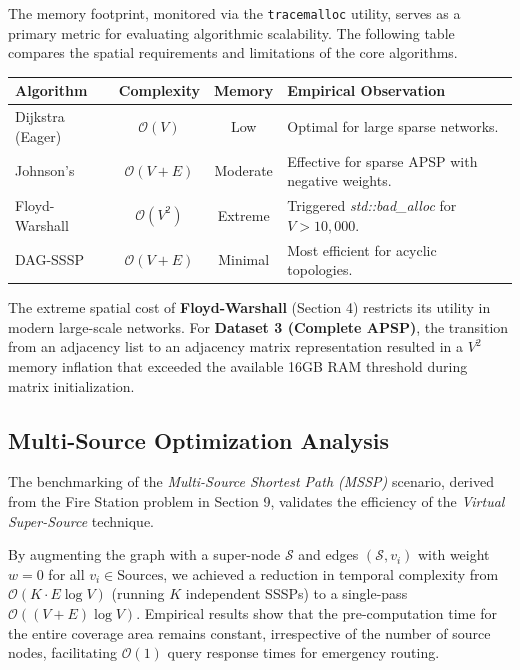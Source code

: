 The memory footprint, monitored via the \texttt{tracemalloc} utility, serves as a primary metric for evaluating algorithmic scalability. The following table compares the spatial requirements and limitations of the core algorithms.

\begin{center}
\small
\begin{tabular}{|p{3cm}|c|c|p{4.5cm}|}
\hline
\textbf{Algorithm} & \textbf{Complexity} & \textbf{Memory} & \textbf{Empirical Observation} \\ \hline
Dijkstra (Eager) & $\mathcal{O}(V)$ & Low & Optimal for large sparse networks. \\ \hline
Johnson's & $\mathcal{O}(V + E)$ & Moderate & Effective for sparse APSP with negative weights. \\ \hline
Floyd-Warshall & $\mathcal{O}(V^2)$ & Extreme & Triggered \textit{std::bad\_alloc} for $V > 10,000$. \\ \hline
DAG-SSSP & $\mathcal{O}(V + E)$ & Minimal & Most efficient for acyclic topologies. \\ \hline
\end{tabular}
\end{center}

The extreme spatial cost of \textbf{Floyd-Warshall} (Section 4) restricts its utility in modern large-scale networks. For \textbf{Dataset 3 (Complete APSP)}, the transition from an adjacency list to an adjacency matrix representation resulted in a $V^2$ memory inflation that exceeded the available 16GB RAM threshold during matrix initialization.

\subsection{Multi-Source Optimization Analysis}

The benchmarking of the \textit{Multi-Source Shortest Path (MSSP)} scenario, derived from the Fire Station problem in Section 9, validates the efficiency of the \textit{Virtual Super-Source} technique. 

By augmenting the graph with a super-node $\mathcal{S}$ and edges $(\mathcal{S}, v_i)$ with weight $w=0$ for all $v_i \in \text{Sources}$, we achieved a reduction in temporal complexity from $\mathcal{O}(K \cdot E \log V)$ (running $K$ independent SSSPs) to a single-pass $\mathcal{O}((V+E) \log V)$. Empirical results show that the pre-computation time for the entire coverage area remains constant, irrespective of the number of source nodes, facilitating $\mathcal{O}(1)$ query response times for emergency routing.

